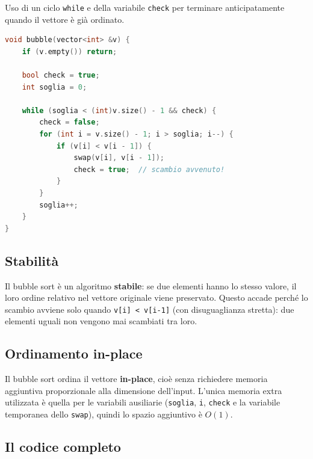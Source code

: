 \begin{codeexample}
Uso di un ciclo \texttt{while} e della variabile \texttt{check} per terminare
anticipatamente quando il vettore \`e gi\`a ordinato.

\begin{codebox}
\begin{lstlisting}[language=C++]
void bubble(vector<int> &v) {
    if (v.empty()) return;

    bool check = true;
    int soglia = 0;

    while (soglia < (int)v.size() - 1 && check) {
        check = false;
        for (int i = v.size() - 1; i > soglia; i--) {
            if (v[i] < v[i - 1]) {
                swap(v[i], v[i - 1]);
                check = true;  // scambio avvenuto!
            }
        }
        soglia++;
    }
}
\end{lstlisting}
\end{codebox}
\end{codeexample}

\subsection*{Stabilit\`a}

Il bubble sort \`e un algoritmo \textbf{stabile}: se due elementi hanno lo stesso valore, il loro ordine relativo nel vettore originale viene preservato. Questo accade perch\'e lo scambio avviene solo quando \lstinline{v[i] < v[i-1]} (con disuguaglianza stretta): due elementi uguali non vengono mai scambiati tra loro.

\subsection*{Ordinamento in-place}

Il bubble sort ordina il vettore \textbf{in-place}, cio\`e senza richiedere memoria aggiuntiva proporzionale alla dimensione dell'input. L'unica memoria extra utilizzata \`e quella per le variabili ausiliarie (\lstinline{soglia}, \lstinline{i}, \lstinline{check} e la variabile temporanea dello \lstinline{swap}), quindi lo spazio aggiuntivo \`e $O(1)$.












\subsection{Il codice completo}
